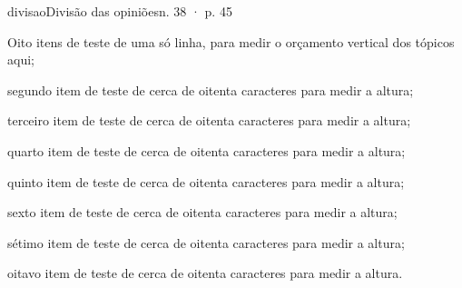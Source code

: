 \documentclass[aspectratio=169,11pt]{beamer}
\begin{document}
\begin{slide}{divisao}{Divisão das opiniões}{n. 38 · p. 45}
\begin{rotulados}
\end{rotulados}
\begin{topicos}
\item Oito itens de teste de uma só linha, para medir o orçamento vertical dos tópicos aqui;
\item segundo item de teste de cerca de oitenta caracteres para medir a altura;
\item terceiro item de teste de cerca de oitenta caracteres para medir a altura;
\item quarto item de teste de cerca de oitenta caracteres para medir a altura;
\item quinto item de teste de cerca de oitenta caracteres para medir a altura;
\item sexto item de teste de cerca de oitenta caracteres para medir a altura;
\item sétimo item de teste de cerca de oitenta caracteres para medir a altura;
\item oitavo item de teste de cerca de oitenta caracteres para medir a altura.
\end{topicos}
\end{slide}
\end{document}
